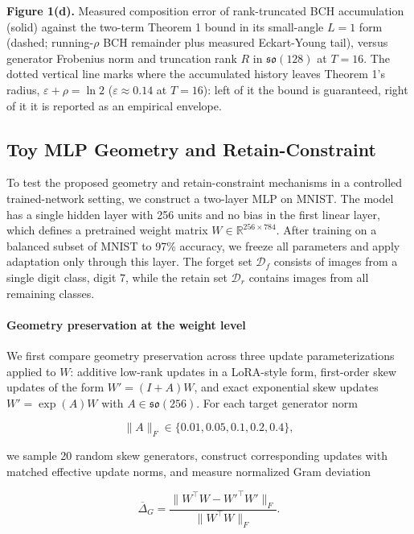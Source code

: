 \documentclass[
]{article}
\begin{document}
\textbf{Figure 1(d).} Measured composition error of rank-truncated BCH accumulation (solid) against the two-term Theorem 1 bound in its small-angle \(L=1\) form (dashed; running-\(\rho\) BCH remainder plus measured Eckart-Young tail), versus generator Frobenius norm and truncation rank \(R\) in \(\mathfrak{so}(128)\) at \(T=16\). The dotted vertical line marks where the accumulated history leaves Theorem 1's radius, \(\varepsilon+\rho=\ln 2\) (\(\varepsilon\approx 0.14\) at \(T=16\)): left of it the bound is guaranteed, right of it it is reported as an empirical envelope.

\subsection{Toy MLP Geometry and Retain-Constraint}\label{toy-mlp-geometry-and-retain-constraint}

To test the proposed geometry and retain-constraint mechanisms in a controlled trained-network setting, we construct a two-layer MLP on MNIST. The model has a single hidden layer with 256 units and no bias in the first linear layer, which defines a pretrained weight matrix \(W\in\mathbb{R}^{256\times 784}\). After training on a balanced subset of MNIST to 97\% accuracy, we freeze all parameters and apply adaptation only through this layer. The forget set \(\mathcal{D}_f\) consists of images from a single digit class, digit 7, while the retain set \(\mathcal{D}_r\) contains images from all remaining classes.

\paragraph{Geometry preservation at the weight level}\label{geometry-preservation-at-the-weight-level}

We first compare geometry preservation across three update parameterizations applied to \(W\): additive low-rank updates in a LoRA-style form, first-order skew updates of the form \(W'=(I+A)W\), and exact exponential skew updates \(W'=\exp(A)W\) with \(A\in\mathfrak{so}(256)\). For each target generator norm

\[
\|A\|_F\in\{0.01,0.05,0.1,0.2,0.4\},
\]

we sample 20 random skew generators, construct corresponding updates with matched effective update norms, and measure normalized Gram deviation

\[
\overline{\Delta}_G=
\frac{\|W^\top W-W'^\top W'\|_F}{\|W^\top W\|_F}.
\]
\end{document}
